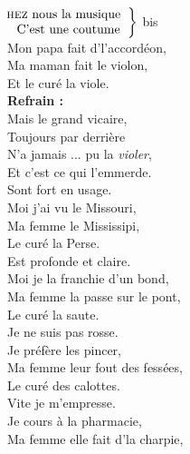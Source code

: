 
\\ 
$\left.\begin{tabular}{l}
\hspace{-0.4cm}
\textsc{hez} nous la musique
\hspace{-0.4cm}
\\
C'est une coutume
\end{tabular}\right\rbrace$ bis
\\Mon papa fait d'l'accordéon, \bissimple
\\Ma maman fait le violon, \bissimple
\\Et le curé la viole. \bissimple
\\\textbf{Refrain :}
\\Mais le grand vicaire,
\\Toujours par derrière 
\\N'a jamais ... pu la \textit{violer},
\\Et c'est ce qui l'emmerde. \bissimple
\\
{Sont fort en usage.}
\\Moi j'ai vu le Missouri, \bissimple
\\Ma femme le Mississipi, \bissimple
\\Le curé la Perse.  \bissimple
\\
{Est profonde et claire.}
\\Moi je la franchie d'un bond, \bissimple
\\Ma femme la passe sur le pont, \bissimple
\\Le curé la saute. \bissimple
\\
{Je ne suis pas rosse.}
\\Je préfère les pincer, \bissimple
\\Ma femme leur fout des fessées, \bissimple
\\Le curé des calottes. \bissimple
\\
{Vite je m'empresse.}
\\Je cours à la pharmacie, \bissimple
\\Ma femme elle fait d'la charpie, \bissimple
